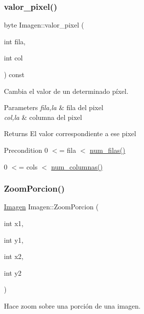 \subsubsection{\texorpdfstring{valor\+\_\+pixel()}{valor\_pixel()}}
{\footnotesize\ttfamily byte Imagen\+::valor\+\_\+pixel (\begin{DoxyParamCaption}\item[{int}]{fila,  }\item[{int}]{col }\end{DoxyParamCaption}) const}



Cambia el valor de un determinado píxel. 


\begin{DoxyParams}{Parameters}
{\em fila,la} & fila del pixel \\
\hline
{\em col,la} & columna del pixel \\
\hline
\end{DoxyParams}
\begin{DoxyReturn}{Returns}
El valor correspondiente a ese pixel 
\end{DoxyReturn}
\begin{DoxyPrecond}{Precondition}
0 $<$= fila $<$ \hyperlink{classImagen_a4cb4faa04f5e2913965e43a6a65acfd1}{num\+\_\+filas()} 

0 $<$= cols $<$ \hyperlink{classImagen_ac28d55c18064aea2a65e6fcf51d86191}{num\+\_\+columnas()} 
\end{DoxyPrecond}
\mbox{\label{classImagen_a5f5af297229cd4dd7878d3cabdfda7b2}} 
\subsubsection{\texorpdfstring{Zoom\+Porcion()}{ZoomPorcion()}}
{\footnotesize\ttfamily \hyperlink{classImagen}{Imagen} Imagen\+::\+Zoom\+Porcion (\begin{DoxyParamCaption}\item[{int}]{x1,  }\item[{int}]{y1,  }\item[{int}]{x2,  }\item[{int}]{y2 }\end{DoxyParamCaption})}



Hace zoom sobre una porción de una imagen. 



